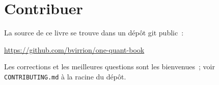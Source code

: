 
\section*{Contribuer}

La source de ce livre se trouve dans un dépôt git public~:
\begin{center}
\url{https://github.com/bvirrion/one-quant-book}
\end{center}
Les corrections et les meilleures questions sont les bienvenues~; voir \texttt{CONTRIBUTING.md} à la racine du dépôt.
